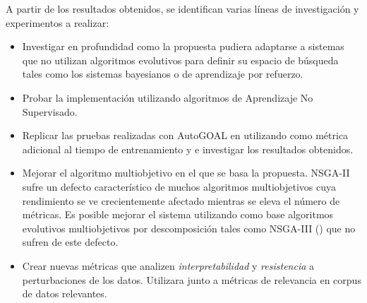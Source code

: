 \begin{recomendations}
A partir de los resultados obtenidos, se identifican varias l\'ineas de investigaci\'on y experimentos a realizar:
\begin{itemize}
    \item Investigar en profundidad  como la propuesta pudiera adaptarse a sistemas que no utilizan algoritmos evolutivos para definir su espacio de b\'usqueda tales como los sistemas bayesianos o de aprendizaje por refuerzo.
    \item Probar la implementaci\'on utilizando algoritmos de Aprendizaje No Supervisado.
    \item Replicar las pruebas realizadas con AutoGOAL en \cite{estevez2020solving} utilizando como m\'etrica adicional al tiempo de entrenamiento y e investigar los resultados obtenidos. 
    \item Mejorar el algoritmo multiobjetivo en el que se basa la propuesta. NSGA-II sufre un defecto caracter\'istico de muchos algoritmos multiobjetivos cuya rendimiento se ve crecientemente afectado mientras se eleva el n\'umero de m\'etricas. Es posible mejorar el sistema utilizando como base algoritmos evolutivos multiobjetivos por descomposici\'on tales como NSGA-III (\cite{deb2013evolutionary}) que no sufren de este defecto.
    
    \item Crear nuevas m\'etricas que analizen \textit{interpretabilidad} y \textit{resistencia} a perturbaciones de los datos. Utilizara junto a m\'etricas de relevancia en corpus de datos relevantes.
\end{itemize}

\end{recomendations}
